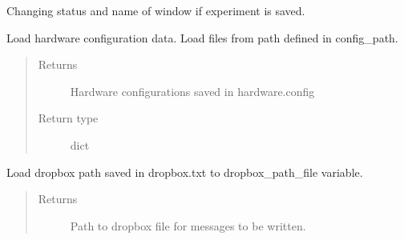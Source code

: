 \documentclass[letterpaper,10pt,english]{sphinxmanual}
\begin{document}
\begin{fulllineitems}
\begin{fulllineitems}
\end{fulllineitems}


\begin{fulllineitems}
\label{\detokenize{NoSeMazeControl/main:main.MainApp.experiment_saved}}
\pysigstartsignatures
{}
\pysigstopsignatures
\sphinxAtStartPar
Changing status and name of window if experiment is saved.

\end{fulllineitems}


\begin{fulllineitems}
\label{\detokenize{NoSeMazeControl/main:main.MainApp.load_config_data}}
\pysigstartsignatures
{}
\pysigstopsignatures
\sphinxAtStartPar
Load hardware configuration data. Load files from path defined in config\_path.
\begin{quote}\begin{description}
\item[{Returns}] \leavevmode
\sphinxAtStartPar
{} \textendash{} Hardware configurations saved in hardware.config

\item[{Return type}] \leavevmode
\sphinxAtStartPar
dict

\end{description}\end{quote}

\end{fulllineitems}


\begin{fulllineitems}
\label{\detokenize{NoSeMazeControl/main:main.MainApp.load_dropbox_path}}
\pysigstartsignatures
{}
\pysigstopsignatures
\sphinxAtStartPar
Load dropbox path saved in dropbox.txt to dropbox\_path\_file variable.
\begin{quote}\begin{description}
\item[{Returns}] \leavevmode
\sphinxAtStartPar
{} \textendash{} Path to dropbox file for messages to be written.


\end{description}
\end{quote}
\end{fulllineitems}
\end{fulllineitems}
\end{document}
